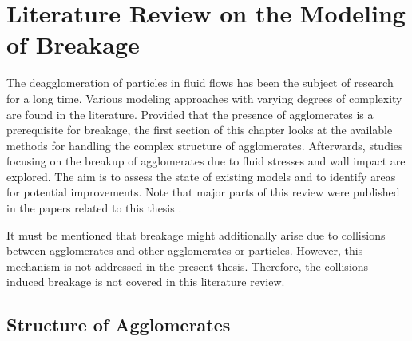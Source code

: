  \chapter{Literature Review on the Modeling of Breakage}
\label{cha:literature_review}

The deagglomeration of particles in fluid flows has been the subject
of research for a long time. Various modeling approaches with varying
degrees of complexity are found in the literature.  Provided that the
presence of agglomerates is a prerequisite for breakage, the first
section of this chapter looks at the available methods for handling
the complex structure of agglomerates. Afterwards, studies focusing on
the breakup of agglomerates due to fluid stresses and wall impact are
explored.  The aim is to assess the state of existing models and to
identify areas for potential improvements. Note that major parts of
this review were published in the papers related to this thesis
\citep{breuer2019revisiting,breuer2019refinement,khalifa2020data,khalifa2021efficient,khalifa2021les,khalifa2022neural}.
 \newline

It must be mentioned that breakage might additionally arise due to
collisions between agglomerates and other agglomerates or
particles. However, this mechanism is not addressed in the present
thesis. Therefore, the collisions-induced breakage is not covered in
this literature review.

\section{Structure of Agglomerates}
\label{sec:litrev_structure}

